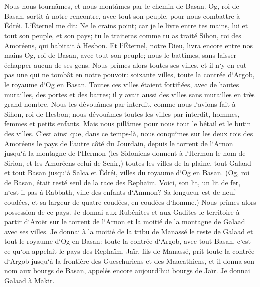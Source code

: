\chapter{}

\verse Nous nous tournâmes, et nous montâmes par le chemin de Basan. Og, roi de Basan, sortit à notre rencontre, avec tout son peuple, pour nous combattre à Édréi. 
\verse L`Éternel me dit: Ne le crains point; car je le livre entre tes mains, lui et tout son peuple, et son pays; tu le traiteras comme tu as traité Sihon, roi des Amoréens, qui habitait à Hesbon. 
\verse Et l`Éternel, notre Dieu, livra encore entre nos mains Og, roi de Basan, avec tout son peuple; nous le battîmes, sans laisser échapper aucun de ses gens. 
\verse Nous prîmes alors toutes ses villes, et il n`y en eut pas une qui ne tombât en notre pouvoir: soixante villes, toute la contrée d`Argob, le royaume d`Og en Basan. 
\verse Toutes ces villes étaient fortifiées, avec de hautes murailles, des portes et des barres; il y avait aussi des villes sans murailles en très grand nombre. 
\verse Nous les dévouâmes par interdit, comme nous l`avions fait à Sihon, roi de Hesbon; nous dévouâmes toutes les villes par interdit, hommes, femmes et petits enfants. 
\verse Mais nous pillâmes pour nous tout le bétail et le butin des villes. 
\verse C`est ainsi que, dans ce temps-là, nous conquîmes sur les deux rois des Amoréens le pays de l`autre côté du Jourdain, depuis le torrent de l`Arnon jusqu`à la montagne de l`Hermon 
\verse (les Sidoniens donnent à l`Hermon le nom de Sirion, et les Amoréens celui de Senir,) 
\verse toutes les villes de la plaine, tout Galaad et tout Basan jusqu`à Salca et Édréi, villes du royaume d`Og en Basan. 
\verse (Og, roi de Basan, était resté seul de la race des Rephaïm. Voici, son lit, un lit de fer, n`est-il pas à Rabbath, ville des enfants d`Ammon? Sa longueur est de neuf coudées, et sa largeur de quatre coudées, en coudées d`homme.) 
\verse Nous prîmes alors possession de ce pays. Je donnai aux Rubénites et aux Gadites le territoire à partir d`Aroër sur le torrent de l`Arnon et la moitié de la montagne de Galaad avec ses villes. 
\verse Je donnai à la moitié de la tribu de Manassé le reste de Galaad et tout le royaume d`Og en Basan: toute la contrée d`Argob, avec tout Basan, c`est ce qu`on appelait le pays des Rephaïm. 
\verse Jaïr, fils de Manassé, prit toute la contrée d`Argob jusqu`à la frontière des Gueschuriens et des Maacathiens, et il donna son nom aux bourgs de Basan, appelés encore aujourd`hui bourgs de Jaïr. 
\verse Je donnai Galaad à Makir. 
